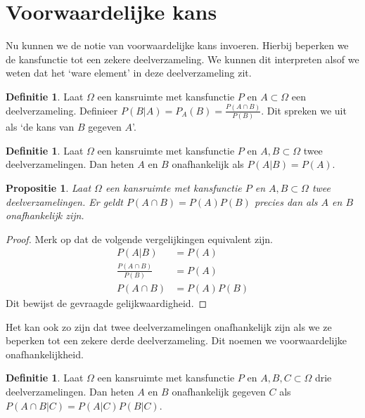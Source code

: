 \documentclass[a4paper]{report}
\newtheorem{proposition}[theorem]{Propositie}
\theoremstyle{definition}
\newtheorem{definition}[theorem]{Definitie}
\begin{document}
\section{Voorwaardelijke kans}
Nu kunnen we de notie van voorwaardelijke kans invoeren.
Hierbij beperken we de kansfunctie tot een zekere deelverzameling.
We kunnen dit interpreten alsof we weten dat het `ware element' in deze deelverzameling zit.
\begin{definition}
    Laat $\Omega$ een kansruimte met kansfunctie $P$ en $A \subset \Omega$ een deelverzameling.
    Definieer $P(B|A) = P_A(B) = \frac{P(A \cap B)}{P(B)}$. Dit spreken we uit als `de kans van $B$ gegeven $A$'.
\end{definition}

\begin{definition}
    Laat $\Omega$ een kansruimte met kansfunctie $P$ en $A,B \subset \Omega$ twee deelverzamelingen.
    Dan heten $A$ en $B$ onafhankelijk als $P(A|B) = P(A)$.
\end{definition}

\begin{proposition}
    Laat $\Omega$ een kansruimte met kansfunctie $P$ en $A,B \subset \Omega$ twee deelverzamelingen.
    Er geldt $P(A \cap B) = P(A)P(B)$ precies dan als $A$ en $B$ onafhankelijk zijn.
\end{proposition}
\begin{proof}
    Merk op dat de volgende vergelijkingen equivalent zijn.
    \begin{align*}
        P(A|B)                      &= P(A) \\
        \frac{P(A \cap B)}{P(B)}    &= P(A) \\
        P(A \cap B)                 &= P(A)P(B)
    \end{align*}
    Dit bewijst de gevraagde gelijkwaardigheid.
\end{proof}

Het kan ook zo zijn dat twee deelverzamelingen onafhankelijk zijn als we ze beperken tot een zekere derde deelverzameling.
Dit noemen we voorwaardelijke onafhankelijkheid.
\begin{definition}
    Laat $\Omega$ een kansruimte met kansfunctie $P$ en $A,B,C \subset \Omega$ drie deelverzamelingen.
    Dan heten $A$ en $B$ onafhankelijk gegeven $C$ als $P(A \cap B|C) = P(A|C)P(B|C)$.
\end{definition}
\end{document}
